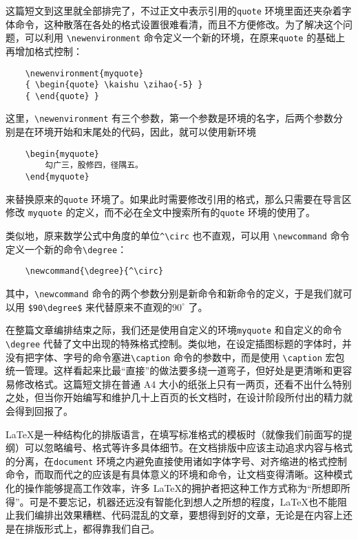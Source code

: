 这篇短文到这里就全部排完了，不过正文中表示引用的\verb|quote| 环境里面还夹杂着字体命令，这种散落在各处的格式设置很难看清，而且不方便修改。为了解决这个问题，可以利用 \verb|\newenvironment| 命令定义一个新的环境，在原来\verb|quote| 的基础上再增加格式控制：
\begin{lstlisting}
    \newenvironment{myquote}
    { \begin{quote} \kaishu \zihao{-5} }
    { \end{quote} }
\end{lstlisting}
这里，\verb|\newenvironment| 有三个参数，第一个参数是环境的名字，后两个参数分别是在环境开始和末尾处的代码，因此，就可以使用新环境
\begin{lstlisting}
    \begin{myquote}
        勾广三，股修四，径隅五。
    \end{myquote}
\end{lstlisting}
来替换原来的\verb|quote| 环境了。如果此时需要修改引用的格式，那么只需要在导言区修改 \verb|myquote| 的定义，而不必在全文中搜索所有的\verb|quote| 环境的使用了。

类似地，原来数学公式中角度的单位\verb|^\circ| 也不直观，可以用 \verb|\newcommand| 命令定义一个新的命令\verb|\degree|：
\begin{lstlisting}
    \newcommand{\degree}{^\circ}
\end{lstlisting}
其中，\verb|\newcommand| 命令的两个参数分别是新命令和新命令的定义，于是我们就可以用 \verb|$90\degree$| 来代替原来不直观的$90^\circ$ 了。

在整篇文章编排结束之际，我们还是使用自定义的环境\verb|myquote| 和自定义的命令\verb|\degree| 代替了文中出现的特殊格式控制。类似地，在设定插图标题的字体时，并没有把字体、字号的命令塞进\verb|\caption| 命令的参数中，而是使用 \verb|\caption| 宏包统一管理。这样看起来比最“直接”的做法要多绕一道弯子，但好处是更清晰和更容易修改格式。这篇短文排在普通 A4 大小的纸张上只有一两页，还看不出什么特别之处，但当你开始编写和维护几十上百页的长文档时，在设计阶段所付出的精力就会得到回报了。

\LaTeX 是一种结构化的排版语言，在填写标准格式的模板时（就像我们前面写的提纲）可以忽略编号、格式等许多具体细节。在文档排版中应该主动追求内容与格式的分离，在\verb|document| 环境之内避免直接使用诸如字体字号、对齐缩进的格式控制命令，而取而代之的应该是有具体意义的环境和命令，让文档变得清晰。这种模式化的操作能够提高工作效率，许多 \LaTeX 的拥护者把这种工作方式称为“所想即所得”。可是不要忘记，机器还远没有智能化到想人之所想的程度，\LaTeX 也不能阻止我们编排出效果糟糕、代码混乱的文章，要想得到好的文章，无论是在内容上还是在排版形式上，都得靠我们自己。
